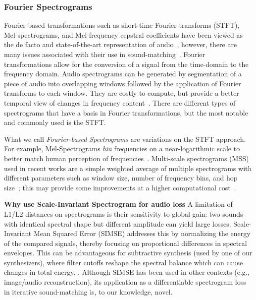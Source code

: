 \subsubsection{Fourier Spectrograms}
\label{sec:fourier_specs}
Fourier-based transformations such as short-time Fourier transforms (\gls{STFT}), Mel-spectrograms, and Mel-frequency cepstral coefficients have been viewed as the de facto and state-of-the-art representation of audio~\cite{beauchamp2003error,mitchell2007evolutionary,yee2018automatic}, however, there are many issues associated with their use in sound-matching~\cite{turian2020sorry,vahidi2023mesostructures,han2023perceptual,uzrad2024diffmoog}. Fourier transformations allow for the conversion of a signal from the time-domain to the frequency domain. Audio spectrograms can be generated by segmentation of a piece of audio into overlapping windows followed by the application of Fourier transforms to each window. They are costly to compute, but provide a better temporal view of changes in frequency content~\cite{muller2007dynamic,smith2007mathematics}. There are different types of spectrograms that have a basis in Fourier transformations, but the most notable and commonly used is the STFT.  

What we call \textit{Fourier-based Spectrograms} are variations on the STFT approach. For example, Mel-Spectrograms \textit{bin} frequencies on a near-logarithmic scale to better match human perception of frequencies~\cite{muller2007dynamic}. Multi-scale spectrograms (\gls{MSS}) used in recent works are a simple weighted average of multiple spectrograms with different parameters such as window size, number of frequency bins, and hop size~\cite{engel2020ddsp,vahidi2023mesostructures}; this may provide some improvements at a higher computational cost~\cite{turian2020sorry,engel2020ddsp}.

\textbf{Why use Scale-Invariant Spectrogram for audio loss}
A limitation of L1/L2 distances on spectrograms is their sensitivity to global gain: 
two sounds with identical spectral shape but different amplitude can yield large losses. 
Scale-Invariant Mean Squared Error (SIMSE) addresses this by normalizing the energy of the compared signals, thereby focusing on proportional differences in spectral envelopes. 
This can be advantageous for subtractive synthesis (used by one of our synthesizers), where filter cutoffs reshape the spectral balance which can cause changes in total energy. 
. 
Although SIMSE has been used in other contexts (e.g., image/audio reconstruction), its application as a differentiable spectrogram loss in iterative sound-matching is, to our knowledge, novel.



